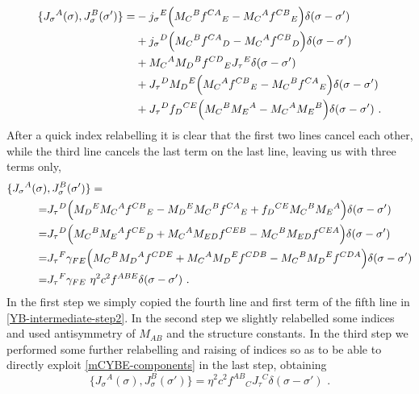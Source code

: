 \documentclass[12pt]{article}
\numberwithin{equation}{section}
\begin{document}
\begin{equation}\label{YB-intermediate-step2}
\begin{aligned}
\{ J_{\sigma}{}^{A}(\sigma),J_{\sigma}^{B}(\sigma') \}=& -j_{\sigma}{}^{E}\Bigl( M_{C}{}^{B}f^{CA}{}_{E}-M_{C}{}^{A}f^{CB}{}_{E} \Bigr) \delta(\sigma-\sigma')
\\
&+
j_{\sigma}{}^{D}\Bigl( M_{C}{}^{B}f^{CA}{}_{D} -M_{C}{}^{A}f^{CB}{}_{D}\Bigr)\delta(\sigma-\sigma')
\\
&+M_{C}{}^{A}M_{D}{}^{B}f^{CD}{}_{E}J_{\tau}{}^{E}\delta(\sigma-\sigma')
\\
&+J_{\tau}{}^{D}M_{D}{}^{E}\Bigl( M_{C}{}^{A}f^{CB}{}_{E}-M_{C}{}^{B}f^{CA}{}_{E} \Bigr)\delta(\sigma-\sigma')
\\
&+J_{\tau}{}^{D}f_{D}{}^{CE}\Bigl( M_{C}{}^{B}M_{E}{}^{A}-M_{C}{}^{A}M_{E}{}^{B} \Bigr)\delta(\sigma-\sigma') \,\, .
\end{aligned}
\end{equation}
After a quick index relabelling it is clear that the first two lines cancel each other, while the third line cancels the last term on the last line, leaving us with three terms only,
\begin{align}
\{ J_{\sigma}{}^{A}(\sigma)&,J_{\sigma}^{B}(\sigma') \}= 
\notag\\
=&J_{\tau}{}^{D} \Bigl( M_{D}{}^{E}M_{C}{}^{A}f^{CB}{}_{E}-M_{D}{}^{E}M_{C}{}^{B}f^{CA}{}_{E}+f_{D}{}^{CE}M_{C}{}^{B}M_{E}{}^{A}\Bigr)\delta(\sigma-\sigma')
\notag\\
=&J_{\tau}{}^{D} \Bigl( M_{C}{}^{B}M_{E}{}^{A}f^{CE}{}_{D}+M_{C}{}^{A}M_{ED}f^{CEB}-M_{C}{}^{B}M_{ED}f^{CEA}\Bigr)\delta(\sigma-\sigma')
\notag\\
=&J_{\tau}{}^{F}\gamma_{FE} \Bigl( M_{C}{}^{B}M_{D}{}^{A}f^{CDE}+M_{C}{}^{A}M_{D}{}^{E}f^{CDB}-M_{C}{}^{B}M_{D}{}^{E}f^{CDA}\Bigr)\delta(\sigma-\sigma')
\notag\\
=&J_{\tau}{}^{F}\gamma_{FE} \,\, \eta^2 c^2 f^{ABE} \delta(\sigma-\sigma') \,\, .
\end{align}
In the first step we simply copied the fourth line and first term of the fifth line in \eqref{YB-intermediate-step2}. In the second step we slightly relabelled some indices and used antisymmetry of $M_{AB}$ and the structure constants. In the third step we performed some further relabelling and raising of indices so as to be able to directly exploit \eqref{mCYBE-components} in the last step, obtaining
\begin{equation}
\{ J_{\sigma}{}^{A}(\sigma),J_{\sigma}^{B}(\sigma') \}= \eta^2 c^2f^{AB}{}_{C}J_{\tau}{}^{C}\delta(\sigma-\sigma') \,\, .
\end{equation}
\end{document}
